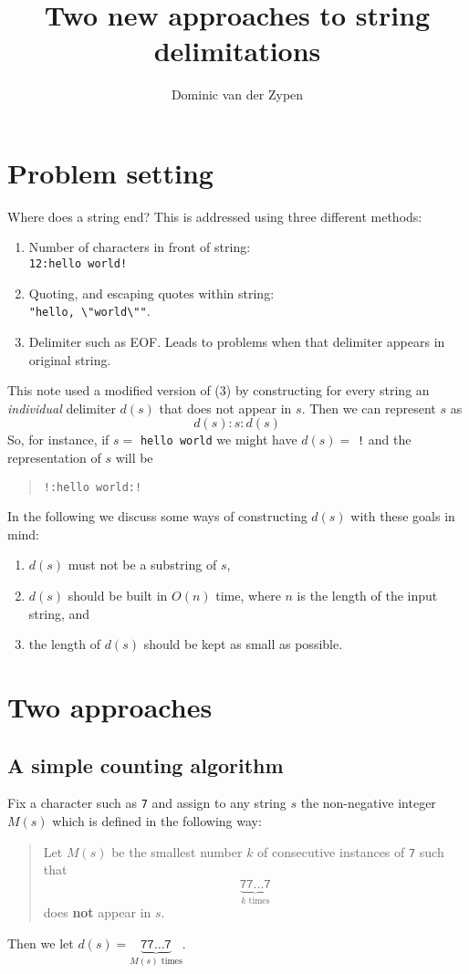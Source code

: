 \documentclass[12pt, a4paper]{amsart}
\begin{document}
\title{Two new approaches to string delimitations}
\author{Dominic van der Zypen}
\maketitle
\vspace*{-8mm}
\section{Problem setting}
Where does a string end? This is addressed using three different methods:
\begin{enumerate}
\item Number of characters in front of string: \\ {\tt 12:hello world!}
\item Quoting, and escaping quotes within string:\\ {\tt "hello,
\textbackslash "world\textbackslash ""}.
\item Delimiter such as EOF. Leads to problems when that
delimiter appears
in original string.
\end{enumerate}
This note used a modified version of (3) by constructing
for every string an {\em individual} delimiter $d(s)$
that does not appear in $s$. Then we can represent $s$ as
$$d(s):s:d(s)$$
So, for instance, if $s =$ {\tt hello world} we might have $d(s) =$ {\tt !}
and the representation of $s$ will be
\begin{quote}
{\tt !:hello world:!}
\end{quote}
In the following we discuss some ways of constructing $d(s)$ with these
goals in mind:
\begin{enumerate}
\item $d(s)$ must not be a substring of $s$,
\item $d(s)$ should be built in $O(n)$ time, where $n$ is the
length of the input string, and
\item the length of $d(s)$ should be kept as small as possible.
\end{enumerate}
\section{Two approaches}
\subsection{A simple counting algorithm} \label{counting}
Fix a character such as {\tt 7}
and assign to any string $s$ the non-negative integer $M(s)$ which
is defined in the following way:
\begin{quote}
Let $M(s)$ be the smallest number $k$ of consecutive instances
of {\tt 7} such that
$$\underbrace{\mathtt{77\ldots7}}_{k\text{ times}}$$
does {\bf not} appear in $s$.
\end{quote}
Then we let $d(s) = \underbrace{\mathtt{77 \ldots 7}}_{M(s)\text{ times}}$.
\end{document}
